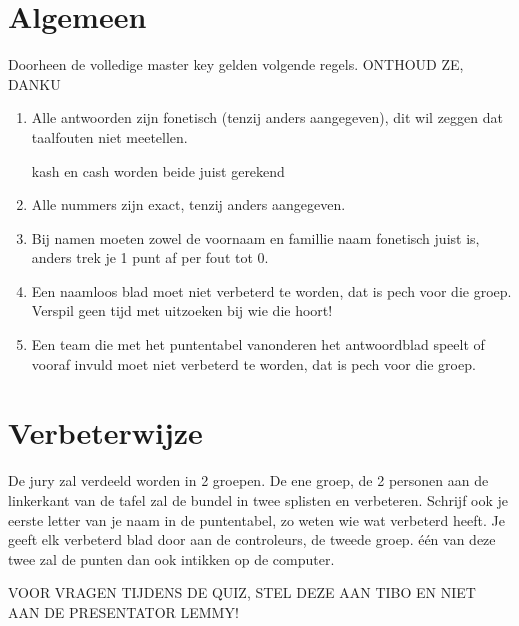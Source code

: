 \documentclass{exam}
\begin{document}
\section*{Algemeen}
Doorheen de volledige master key gelden volgende regels.
\large{ONTHOUD ZE, DANKU }
\begin{enumerate}
\item{Alle antwoorden zijn fonetisch (tenzij anders aangegeven), dit wil zeggen dat taalfouten niet meetellen.\par kash en cash worden beide juist gerekend}
\item{Alle nummers zijn exact, tenzij anders aangegeven.}
\item{Bij namen moeten zowel de voornaam en famillie naam fonetisch juist is, anders trek je 1 punt af per fout tot 0. }
\item{Een naamloos blad moet niet verbeterd te worden, dat is pech voor die groep. Verspil geen tijd met uitzoeken bij wie die hoort!}
\item{Een team die met het puntentabel vanonderen het antwoordblad speelt of vooraf invuld moet niet verbeterd te worden, dat is pech voor die groep.}
\end{enumerate}
\section*{Verbeterwijze}
De jury zal verdeeld worden in 2 groepen. De ene groep, de 2 personen aan de linkerkant van de tafel zal de bundel in twee splisten en verbeteren. Schrijf ook je eerste letter van je naam in de puntentabel, zo weten wie wat verbeterd heeft. Je geeft elk verbeterd blad door aan de controleurs, de tweede groep. één van deze twee zal de punten dan ook intikken op de computer.\linebreak\par

\large{VOOR VRAGEN TIJDENS DE QUIZ, STEL DEZE AAN TIBO EN NIET AAN DE PRESENTATOR LEMMY!}
\newpage

\newpage

\newpage

\newpage

\newpage

\newpage

\newpage

\newpage

\newpage

\newpage
%
%
%
%
%
\end{document}

